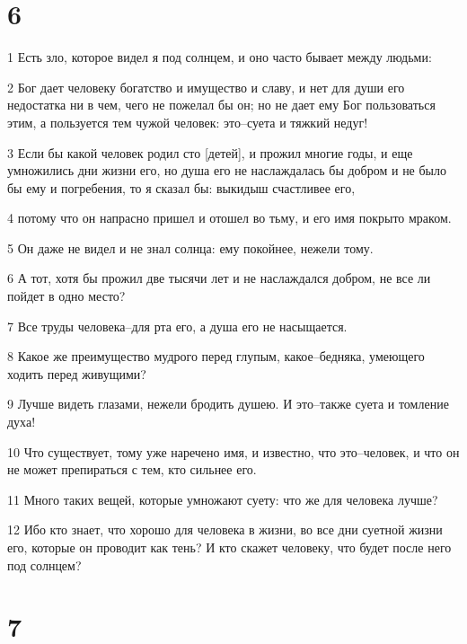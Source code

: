 \chapter{6}

\par 1 Есть зло, которое видел я под солнцем, и оно часто бывает между людьми:
\par 2 Бог дает человеку богатство и имущество и славу, и нет для души его недостатка ни в чем, чего не пожелал бы он; но не дает ему Бог пользоваться этим, а пользуется тем чужой человек: это--суета и тяжкий недуг!
\par 3 Если бы какой человек родил сто [детей], и прожил многие годы, и еще умножились дни жизни его, но душа его не наслаждалась бы добром и не было бы ему и погребения, то я сказал бы: выкидыш счастливее его,
\par 4 потому что он напрасно пришел и отошел во тьму, и его имя покрыто мраком.
\par 5 Он даже не видел и не знал солнца: ему покойнее, нежели тому.
\par 6 А тот, хотя бы прожил две тысячи лет и не наслаждался добром, не все ли пойдет в одно место?
\par 7 Все труды человека--для рта его, а душа его не насыщается.
\par 8 Какое же преимущество мудрого перед глупым, какое--бедняка, умеющего ходить перед живущими?
\par 9 Лучше видеть глазами, нежели бродить душею. И это--также суета и томление духа!
\par 10 Что существует, тому уже наречено имя, и известно, что это--человек, и что он не может препираться с тем, кто сильнее его.
\par 11 Много таких вещей, которые умножают суету: что же для человека лучше?
\par 12 Ибо кто знает, что хорошо для человека в жизни, во все дни суетной жизни его, которые он проводит как тень? И кто скажет человеку, что будет после него под солнцем?

\chapter{7}

